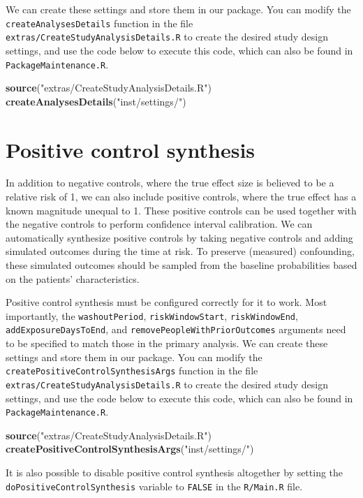 \documentclass[
]{article}
\newenvironment{Shaded}{\begin{snugshade}}{\end{snugshade}}
\newcommand{\KeywordTok}[1]{\textcolor[rgb]{0.13,0.29,0.53}{\textbf{#1}}}
\newcommand{\NormalTok}[1]{#1}
\newcommand{\StringTok}[1]{\textcolor[rgb]{0.31,0.60,0.02}{#1}}
\begin{document}
We can create these settings and store them in our package. You can
modify the \texttt{createAnalysesDetails} function in the file
\texttt{extras/CreateStudyAnalysisDetails.R} to create the desired study
design settings, and use the code below to execute this code, which can
also be found in \texttt{PackageMaintenance.R}.

\begin{Shaded}
\begin{Highlighting}[]
\KeywordTok{source}\NormalTok{(}\StringTok{"extras/CreateStudyAnalysisDetails.R"}\NormalTok{)}
\KeywordTok{createAnalysesDetails}\NormalTok{(}\StringTok{"inst/settings/"}\NormalTok{)}
\end{Highlighting}
\end{Shaded}

\hypertarget{positive-control-synthesis}{%
\section{Positive control synthesis}\label{positive-control-synthesis}}

In addition to negative controls, where the true effect size is believed
to be a relative risk of 1, we can also include positive controls, where
the true effect has a known magnitude unequal to 1. These positive
controls can be used together with the negative controls to perform
confidence interval calibration. We can automatically synthesize
positive controls by taking negative controls and adding simulated
outcomes during the time at risk. To preserve (measured) confounding,
these simulated outcomes should be sampled from the baseline
probabilities based on the patients' characteristics.

Positive control synthesis must be configured correctly for it to work.
Most importantly, the \texttt{washoutPeriod}, \texttt{riskWindowStart},
\texttt{riskWindowEnd}, \texttt{addExposureDaysToEnd}, and
\texttt{removePeopleWithPriorOutcomes} arguments need to be specified to
match those in the primary analysis. We can create these settings and
store them in our package. You can modify the
\texttt{createPositiveControlSynthesisArgs} function in the file
\texttt{extras/CreateStudyAnalysisDetails.R} to create the desired study
design settings, and use the code below to execute this code, which can
also be found in \texttt{PackageMaintenance.R}.

\begin{Shaded}
\begin{Highlighting}[]
\KeywordTok{source}\NormalTok{(}\StringTok{"extras/CreateStudyAnalysisDetails.R"}\NormalTok{)}
\KeywordTok{createPositiveControlSynthesisArgs}\NormalTok{(}\StringTok{"inst/settings/"}\NormalTok{)}
\end{Highlighting}
\end{Shaded}

It is also possible to disable positive control synthesis altogether by
setting the \texttt{doPositiveControlSynthesis} variable to
\texttt{FALSE} in the \texttt{R/Main.R} file.
\end{document}
